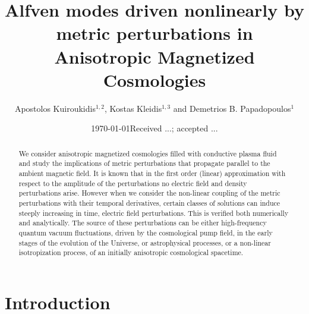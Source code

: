 \documentclass[prd,twocolumn,showpacs,preprintnumbers,amsmath,amssy mb]{revtex4}
\begin{document}
\title{Alfven modes driven nonlinearly by 
metric perturbations in\\ Anisotropic 
Magnetized Cosmologies}

\preprint{}


\author{Apostolos Kuiroukidis$^{1,2}$, Kostas Kleidis$^{1,3}$ and Demetrios B. Papadopoulos$^{1}$}





\date{\today}

\date{Received ...; accepted ...}




\begin{abstract}
We consider anisotropic magnetized cosmologies filled with 
conductive plasma 
fluid and study the implications of metric perturbations that 
propagate parallel to the ambient magnetic field. It is known that 
in the first order (linear) approximation with respect to the 
amplitude of the perturbations no electric field and density 
perturbations arise. However when we consider the non-linear coupling 
of the metric perturbations with their temporal derivatives, 
certain classes of solutions can induce steeply increasing in time, 
electric field perturbations. This is verified both 
numerically and analytically. The source of these perturbations can 
be either high-frequency quantum vacuum fluctuations, driven by the 
cosmological pump field, in the early stages of the evolution of the 
Universe, or astrophysical processes, or a non-linear isotropization 
process, of an initially anisotropic cosmological spacetime. 
\end{abstract}

\pacs{}

\maketitle

\section{Introduction}
\end{document}
